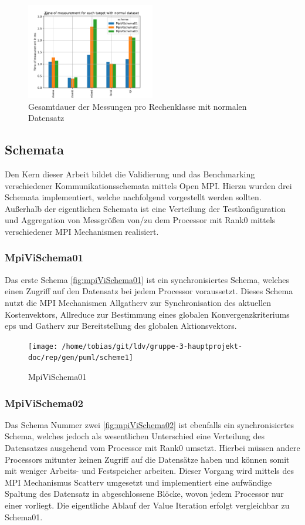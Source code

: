 \begin{figure}[h]
	\includegraphics[width=0.5\textwidth]{../gen/img/ds/normal/runtime_measurement_target.pdf}
	\caption{Gesamtdauer der Messungen pro Rechenklasse mit normalen Datensatz}
	\label{fig:durationMeasurementsNormal}
\end{figure}

\subsection{Schemata}
\label{ssec:schemata}

Den Kern dieser Arbeit bildet die Validierung und das Benchmarking verschiedener Kommunikationsschemata mittels Open MPI. Hierzu wurden drei Schemata implementiert, welche nachfolgend vorgestellt werden sollten. Außerhalb der eigentlichen Schemata ist eine Verteilung der Testkonfiguration und Aggregation von Messgrößen von/zu dem Processor mit Rank0 mittels verschiedener MPI Mechanismen realisiert.

\subsubsection{MpiViSchema01}
Das erste Schema \autoref{fig:mpiViSchema01} ist ein synchronisiertes Schema, welches einen Zugriff auf den Datensatz bei jedem Processor voraussetzt. Dieses Schema nutzt die MPI Mechanismen Allgatherv zur Synchronisation des aktuellen Kostenvektors, Allreduce zur Bestimmung eines globalen Konvergenzkriteriums eps und Gatherv zur Bereitstellung des globalen Aktionsvektors.

\begin{figure}[h]
	\centering
	\texttt{[image: /home/tobias/git/ldv/gruppe-3-hauptprojekt-doc/rep/gen/puml/scheme1]}
	\caption{MpiViSchema01}
	\label{fig:mpiViSchema01}
\end{figure}

\subsubsection{MpiViSchema02}
Das Schema Nummer zwei \autoref{fig:mpiViSchema02} ist ebenfalls ein synchronisiertes Schema, welches jedoch als wesentlichen Unterschied eine Verteilung des Datensatzes ausgehend vom Processor mit Rank0 umsetzt. Hierbei müssen andere Processors mitunter keinen Zugriff auf die Datensätze haben und können somit mit weniger Arbeits- und Festspeicher arbeiten. Dieser Vorgang wird mittels des MPI Mechanismus Scatterv umgesetzt und implementiert eine aufwändige Spaltung des Datensatz in abgeschlossene Blöcke, wovon jedem Processor nur einer vorliegt. Die eigentliche Ablauf der Value Iteration erfolgt vergleichbar zu Schema01.


